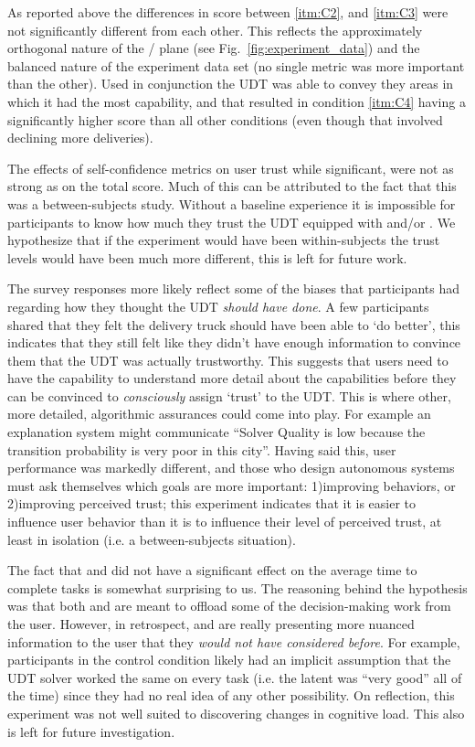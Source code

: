 As reported above the differences in score between \ref{itm:C2}, and \ref{itm:C3} were not significantly different from each other. This reflects the approximately orthogonal nature of the \xQ/\xO{} plane (see Fig.~\ref{fig:experiment_data}) and the balanced nature of the experiment data set (no single metric was more important than the other). Used in conjunction the UDT was able to convey they areas in which it had the most capability, and that resulted in condition \ref{itm:C4} having a significantly higher score than all other conditions (even though that involved declining more deliveries).

The effects of self-confidence metrics on user trust while significant, were not as strong as on the total score. Much of this can be attributed to the fact that this was a between-subjects study. Without a baseline experience it is impossible for participants to know how much they trust the UDT equipped with \xQ{} and/or \xO. We hypothesize that if the experiment would have been within-subjects the trust levels would have been much more different, this is left for future work.

The survey responses more likely reflect some of the biases that participants had regarding how they thought the UDT \emph{should have done}. A few participants shared that they felt the delivery truck should have been able to `do better', this indicates that they still felt like they didn't have enough information to convince them that the UDT was actually trustworthy. This suggests that users need to have the capability to understand more detail about the capabilities before they can be convinced to \emph{consciously} assign `trust' to the UDT. This is where other, more detailed, algorithmic assurances could come into play. For example an explanation system might communicate ``Solver Quality is low because the transition probability is very poor in this city''. Having said this, user performance was markedly different, and those who design autonomous systems must ask themselves which goals are more important: 1)improving behaviors, or 2)improving perceived trust; this experiment indicates that it is easier to influence user behavior than it is to influence their level of perceived trust, at least in isolation (i.e. a between-subjects situation).

The fact that \xQ{} and \xO{} did not have a significant effect on the average time to complete tasks is somewhat surprising to us. The reasoning behind the hypothesis was that both \xQ{} and \xO{} are meant to offload some of the decision-making work from the user. However, in retrospect, \xQ{} and \xO{} are really presenting more nuanced information to the user that they \emph{would not have considered before}. For example, participants in the control condition likely had an implicit assumption that the UDT solver worked the same on every task (i.e. the latent \xQ{} was ``very good'' all of the time) since they had no real idea of any other possibility. On reflection, this experiment was not well suited to discovering changes in cognitive load. This also is left for future investigation.

